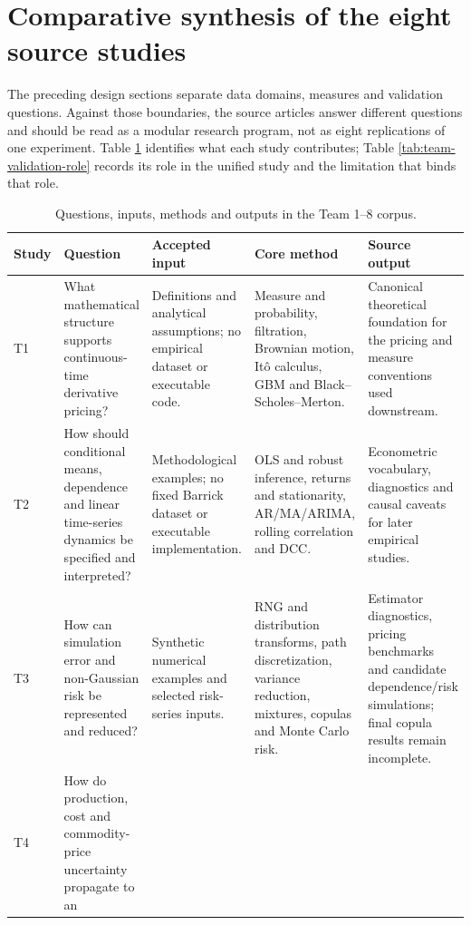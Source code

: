 \section{Comparative synthesis of the eight source studies}
\label{sec:team-study-synthesis}

The preceding design sections separate data domains, measures and validation
questions. Against those boundaries, the source articles answer different
questions and should be read as a modular research program, not as eight
replications of one experiment. Table
\ref{tab:team-question-model-output} identifies what each study contributes;
Table \ref{tab:team-validation-role} records its role in the unified study and
the limitation that binds that role.

\begin{table}[H]
\centering
\caption{Questions, inputs, methods and outputs in the Team 1--8 corpus.}
\label{tab:team-question-model-output}
\scriptsize
\setlength{\tabcolsep}{3pt}
\renewcommand{\arraystretch}{1.10}
\begin{tabularx}{\textwidth}{@{}p{0.85cm}p{2.32cm}X X X@{}}
\toprule
\textbf{Study} & \textbf{Question} & \textbf{Accepted input} &
\textbf{Core method} & \textbf{Source output} \\
\midrule
T1 & What mathematical structure supports continuous-time derivative pricing?
& Definitions and analytical assumptions; no empirical dataset or executable
code. & Measure and probability, filtration, Brownian motion, It\^o calculus,
GBM and Black--Scholes--Merton. & Canonical theoretical foundation for the
pricing and measure conventions used downstream. \\
T2 & How should conditional means, dependence and linear time-series dynamics
be specified and interpreted? & Methodological examples; no fixed Barrick
dataset or executable implementation. & OLS and robust inference, returns and
stationarity, AR/MA/ARIMA, rolling correlation and DCC. & Econometric vocabulary,
diagnostics and causal caveats for later empirical studies. \\
T3 & How can simulation error and non-Gaussian risk be represented and reduced?
& Synthetic numerical examples and selected risk-series inputs. & RNG and
distribution transforms, path discretization, variance reduction, mixtures,
copulas and Monte Carlo risk. & Estimator diagnostics, pricing benchmarks and
candidate dependence/risk simulations; final copula results remain incomplete. \\
T4 & How do production, cost and commodity-price uncertainty propagate to an

\end{tabularx}
\end{table}
